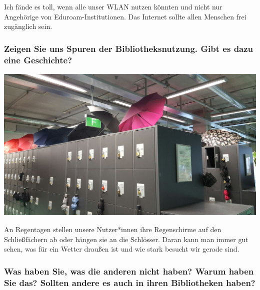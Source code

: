 Ich fände es toll, wenn alle unser WLAN nutzen könnten und nicht nur
Angehörige von Eduroam-Institutionen. Das Internet sollte allen Menschen
frei zugänglich sein.

\hypertarget{zeigen-sie-uns-spuren-der-bibliotheksnutzung.-gibt-es-dazu-eine-geschichte}{%
\subsubsection*{Zeigen Sie uns Spuren der Bibliotheksnutzung. Gibt es dazu eine
Geschichte?}\label{zeigen-sie-uns-spuren-der-bibliotheksnutzung.-gibt-es-dazu-eine-geschichte}}

\begin{center}
\includegraphics{tu-berlin/img/regenschirme.jpg}
\end{center}

An Regentagen stellen unsere Nutzer*innen ihre Regenschirme auf den
Schließfächern ab oder hängen sie an die Schlösser. Daran kann man immer
gut sehen, was für ein Wetter draußen ist und wie stark besucht wir
gerade sind.

\hypertarget{was-haben-sie-was-die-anderen-nicht-haben-warum-haben-sie-das-sollten-andere-es-auch-in-ihren-bibliotheken-haben}{%
\subsubsection*{Was haben Sie, was die anderen nicht haben? Warum haben Sie
das? Sollten andere es auch in ihren Bibliotheken
haben?}\label{was-haben-sie-was-die-anderen-nicht-haben-warum-haben-sie-das-sollten-andere-es-auch-in-ihren-bibliotheken-haben}}

